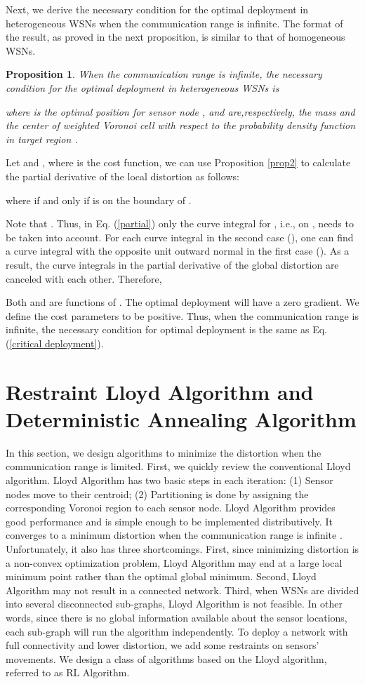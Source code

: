 \documentclass[journal,draftcls,onecolumn,12pt,twoside, narroweqnarray]{IEEEtran}
\newtheorem{prop}{Proposition}
\begin{document}
Next, we derive the necessary condition for the optimal deployment in heterogeneous WSNs when the communication range is infinite. The format of the result, as proved in the next proposition, is similar to that of homogeneous WSNs.
\begin{prop}
When the communication range is infinite, the necessary condition for the optimal deployment in heterogeneous WSNs is

where  is the optimal position for sensor node ,  and  are,respectively, the mass and the center of weighted Voronoi cell  with respect to the probability density function  in target region .
\end{prop}
\begin{IEEEproof}
Let  and , where  is the cost function, we can use Proposition \ref{prop2} to calculate the partial derivative of the local distortion as follows:

where  if and only if  is on the boundary of .

Note that .
  Thus, in Eq. (\ref{partial}) only the curve integral for , i.e.,  on , needs to be taken into account. For each curve integral in the second case (), one can find a curve integral with the opposite unit outward normal in the first case (). As a result, the curve integrals in the partial derivative of the global distortion are canceled with each other. Therefore,

Both  and  are functions of . The optimal deployment  will have a zero gradient. We define the cost parameters to be positive. Thus, when the communication range is infinite, the necessary condition for optimal deployment is the same as Eq. (\ref{critical deployment}).
\end{IEEEproof}
\section{Restraint Lloyd Algorithm and Deterministic Annealing Algorithm}
In this section, we design algorithms to minimize the distortion when the communication range is limited.
First, we quickly review the conventional Lloyd algorithm. Lloyd Algorithm has two basic steps in each iteration: (1) Sensor nodes move to their centroid; (2) Partitioning is done by assigning the corresponding Voronoi region to each sensor node. Lloyd Algorithm provides good performance and is simple enough to be implemented distributively. It converges to a minimum distortion when the communication range is infinite \cite{SD}. Unfortunately, it also has three shortcomings. First, since minimizing distortion is a non-convex optimization problem, Lloyd Algorithm may end at a large local minimum point rather than the optimal global minimum. Second, Lloyd Algorithm may not result in a connected network. Third, when WSNs are divided into several disconnected sub-graphs, Lloyd Algorithm is not feasible. In other words, since there is no global information available about the sensor locations, each sub-graph will run the algorithm independently. To deploy a network with full connectivity and lower distortion, we add some restraints on sensors' movements. We design a class of algorithms based on the Lloyd algorithm, referred to as RL Algorithm.
\end{document}
